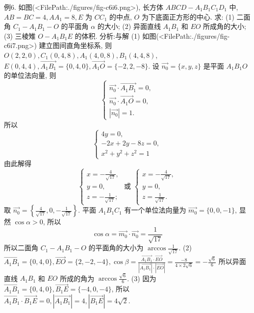 例6. 如图(<FilePath:./figures/fig-c6i6.png>), 长方体 $A B C D-A_1 B_1 C_1 D_1$ 中, $A B= B C=4, A A_1=8, E$ 为 $C C_1$ 的中点, $O$ 为下底面正方形的中心.
求:
(1) 二面角 $C_1-A_1 B_1-O$ 的平面角 $\alpha$ 的大小;
(2) 异面直线 $A_1 B_1$ 和 $E O$ 所成角的大小;
(3) 三棱雉 $O-A_1 B_1 E$ 的体积.
分析:与解 (1) 如图(<FilePath:./figures/fig-c6i7.png>) 建立图间直角坐标系, 则 $O(2,2,0), C_1(0,4,8), A_1(4,0,8), B_1(4,4,8)$,
$E(0,4,4), \overrightarrow{A_1 B_1}=\{0,4,0\}, \overrightarrow{A_1 O}=\{-2,2,-8\}$.
设 $\overrightarrow{n_0}=\{x, y, z\}$ 是平面 $A_1 B_1 O$ 的单位法向量, 则
$$
\left\{\begin{array}{l}
\overrightarrow{n_0} \cdot \overrightarrow{A_1 B_1}=0, \\
\overrightarrow{n_0} \cdot \overrightarrow{A_1 O}=0, \\
\left|\overrightarrow{n_0}\right|=1 .
\end{array}\right.
$$
所以
$$
\left\{\begin{array}{l}
4 y=0, \\
-2 x+2 y-8 z=0, \\
x^2+y^2+z^2=1
\end{array}\right.
$$
由此解得
$$
\left\{\begin{array} { l } 
{ x = - \frac { 4 } { \sqrt { 1 7 } } , } \\
{ y = 0 , } \\
{ z = - \frac { 1 } { \sqrt { 1 7 } } ; }
\end{array} \text { 或 } \left\{\begin{array}{l}
x=-\frac{4}{\sqrt{17}}, \\
y=0, \\
z=\frac{1}{\sqrt{17}} .
\end{array}\right.\right.
$$
取 $\overrightarrow{n_0}=\left\{\frac{4}{\sqrt{17}}, 0,-\frac{1}{\sqrt{17}}\right\}$.
平面 $A_1 B_1 C_1$ 有一个单位法向量为 $\overrightarrow{m_0}=\{0,0,-1\}$, 显然 $\cos \alpha>0$, 所以
$$
\cos \alpha=\overrightarrow{m_0} \cdot \overrightarrow{n_0}=\frac{1}{\sqrt{17}}
$$
所以二面角 $C_1-A_1 B_1-O$ 的平面角的大小为 $\arccos \frac{1}{\sqrt{17}}$.
(2) $\overrightarrow{A_1 B_1}=\{0,4,0\}, \overrightarrow{E O}=\{2,-2,-4\}, \cos \beta=\frac{\overrightarrow{A_1 B_1} \cdot \overrightarrow{E O}}{\left|\overrightarrow{A_1 B_1}\right| \cdot|\overrightarrow{E O}|}= \frac{-8}{4 \times 2 \sqrt{6}}=-\frac{\sqrt{6}}{6}$
所以异面直线 $A_1 B_1$ 和 $E O$ 所成的角为 $\arccos \frac{\sqrt{6}}{6}$.
(3) 因为 $\overrightarrow{A_1 B_1}=\{0,4,0\}, \overrightarrow{B_1 E}=\{-4,0,-4\}$, 所以 $\overrightarrow{A_1 B_1} \cdot \overrightarrow{B_1 E}= 0,\left|\overrightarrow{A_1 B_1}\right|=4,\left|\overrightarrow{B_1 E}\right|=4 \sqrt{2}$.
